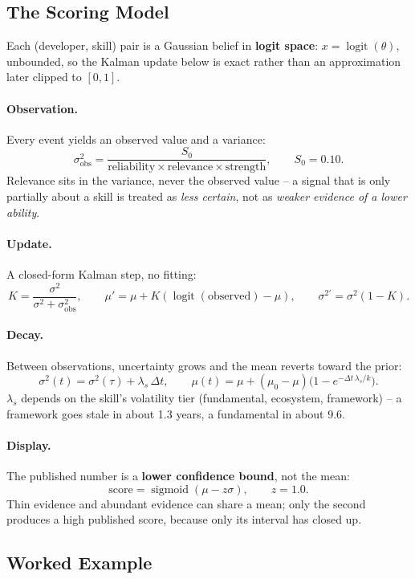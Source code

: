 \documentclass[11pt,a4paper]{article}
\DeclareMathOperator{\logit}{logit}
\DeclareMathOperator{\sig}{sigmoid}
\begin{document}
\subsection{The Scoring Model}

Each (developer, skill) pair is a Gaussian belief in \textbf{logit space}:
$x = \logit(\theta)$, unbounded, so the Kalman update below is exact rather
than an approximation later clipped to $[0,1]$.

\paragraph{Observation.} Every event yields an observed value and a
variance:
\[
\sigma^2_{\mathrm{obs}} = \frac{S_0}{\text{reliability} \times \text{relevance} \times \text{strength}},
\qquad S_0 = 0.10.
\]
Relevance sits in the variance, never the observed value -- a signal that is
only partially about a skill is treated as \emph{less certain}, not as
\emph{weaker evidence of a lower ability}.

\paragraph{Update.} A closed-form Kalman step, no fitting:
\[
K = \frac{\sigma^2}{\sigma^2+\sigma^2_{\mathrm{obs}}}, \qquad
\mu' = \mu + K(\logit(\text{observed})-\mu), \qquad
\sigma^{2\prime} = \sigma^2(1-K).
\]

\paragraph{Decay.} Between observations, uncertainty grows and the mean
reverts toward the prior:
\[
\sigma^2(t) = \sigma^2(\tau) + \lambda_s\,\Delta t, \qquad
\mu(t) = \mu + (\mu_0-\mu)\big(1-e^{-\Delta t\,\lambda_s/k}\big).
\]
$\lambda_s$ depends on the skill's volatility tier (fundamental, ecosystem,
framework) -- a framework goes stale in about 1.3 years, a fundamental in
about 9.6.

\paragraph{Display.} The published number is a \textbf{lower confidence
bound}, not the mean:
\[
\text{score} = \sig(\mu - z\sigma), \qquad z = 1.0.
\]
Thin evidence and abundant evidence can share a mean; only the second
produces a high published score, because only its interval has closed up.

\subsection{Worked Example}
\end{document}
